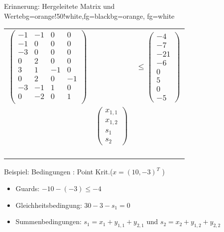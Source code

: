 \begin{frame}
	\begin{variableblock}{Erinnerung: Hergeleitete Matrix und Werte}{bg=orange!50!white,fg=black}{bg=orange, fg=white}
		\centering
		\begin{tabular}{rll}
			\multirow{2}{*}{$\begin{pmatrix}
				-1 		& -1 		&  0		& 0		 \\
				-1 		& 0 		&  0		& 0		 \\
				-3 		& 0 		&  0		& 0		 \\
				0 		& 2 		&  0		& 0		 \\
				3 		& 1 		&  -1		& 0		 \\
				0 		& 2 		&  0		& -1	 \\
				-3 		& -1 		&  1		& 0		 \\
				0 		& -2 		&  0		& 1	 	 \\
				\end{pmatrix}$}& &\multirow{2}{*}{$ \le \begin{pmatrix}
				-4 \\ -7 \\ -21 \\ -6 \\ 0 \\ 5 \\ 0 \\ -5
				\end{pmatrix} $}\\
			& & \\
			& \multirow{2}{*}{$\begin{pmatrix}
				x_{1,1} \\ x_{1,2} \\ s_{1} \\ s_{2}
				\end{pmatrix} $} & \\
			& & \\
			& & \\
			& & \\
			& & \\
			& & \\
		\end{tabular}
	\end{variableblock}
	\vspace*{-.5em}
	\begin{exampleblock}{Beispiel: Bedingungen : Point Krit.($x=(10, -3)^T$ )}
		\begin{itemize}
			\item Guards: $-10-(-3)\le-4$
			\item Gleichheitsbedingung: $30-3-s_1=0$
			\item Summenbedingungen: $s_1= x_1+y_{1,1}+y_{2,1}$ und $s_2=x_2+y_{1,2}+y_{2,2}$
		\end{itemize}
	\end{exampleblock}	
\end{frame}

